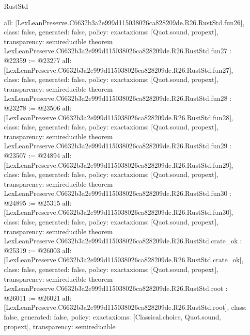 \begin{lexlean}{RustStd}
\begin{coremodule}
{  all: [LexLeanPreserve.C6632b3a2e999d115038026ca828209de.R26.RustStd.fun26],
  class: false,
  generated: false,
  policy: exact{axioms: [Quot.sound, propext]},
  transparency: semireducible
}
theorem LexLeanPreserve.C6632b3a2e999d115038026ca828209de.R26.RustStd.fun27 : @22359 := @23277 {
  all: [LexLeanPreserve.C6632b3a2e999d115038026ca828209de.R26.RustStd.fun27],
  class: false,
  generated: false,
  policy: exact{axioms: [Quot.sound, propext]},
  transparency: semireducible
}
theorem LexLeanPreserve.C6632b3a2e999d115038026ca828209de.R26.RustStd.fun28 : @23278 := @23506 {
  all: [LexLeanPreserve.C6632b3a2e999d115038026ca828209de.R26.RustStd.fun28],
  class: false,
  generated: false,
  policy: exact{axioms: [Quot.sound, propext]},
  transparency: semireducible
}
theorem LexLeanPreserve.C6632b3a2e999d115038026ca828209de.R26.RustStd.fun29 : @23507 := @24894 {
  all: [LexLeanPreserve.C6632b3a2e999d115038026ca828209de.R26.RustStd.fun29],
  class: false,
  generated: false,
  policy: exact{axioms: [Quot.sound, propext]},
  transparency: semireducible
}
theorem LexLeanPreserve.C6632b3a2e999d115038026ca828209de.R26.RustStd.fun30 : @24895 := @25315 {
  all: [LexLeanPreserve.C6632b3a2e999d115038026ca828209de.R26.RustStd.fun30],
  class: false,
  generated: false,
  policy: exact{axioms: [Quot.sound, propext]},
  transparency: semireducible
}
theorem LexLeanPreserve.C6632b3a2e999d115038026ca828209de.R26.RustStd.crate_ok : @25319 := @26003 {
  all: [LexLeanPreserve.C6632b3a2e999d115038026ca828209de.R26.RustStd.crate_ok],
  class: false,
  generated: false,
  policy: exact{axioms: [Quot.sound, propext]},
  transparency: semireducible
}
theorem LexLeanPreserve.C6632b3a2e999d115038026ca828209de.R26.RustStd.root : @26011 := @26021 {
  all: [LexLeanPreserve.C6632b3a2e999d115038026ca828209de.R26.RustStd.root],
  class: false,
  generated: false,
  policy: exact{axioms: [Classical.choice, Quot.sound, propext]},
  transparency: semireducible
}


\end{coremodule}
\end{lexlean}
